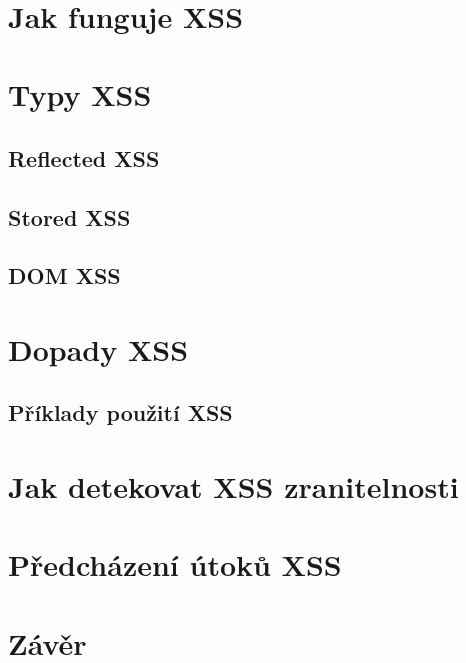 \documentclass[conference]{IEEEtran}
\begin{document}
~\cite{Grossman2007}


\section{Jak funguje XSS}


\section{Typy XSS}
\subsection{Reflected XSS}
\subsection{Stored XSS}
\subsection{DOM XSS}

\section{Dopady XSS}
\subsection{Příklady použití XSS}
\section{Jak detekovat XSS zranitelnosti}
\section{Předcházení útoků XSS}
\section{Závěr}



  
  
\end{document}
